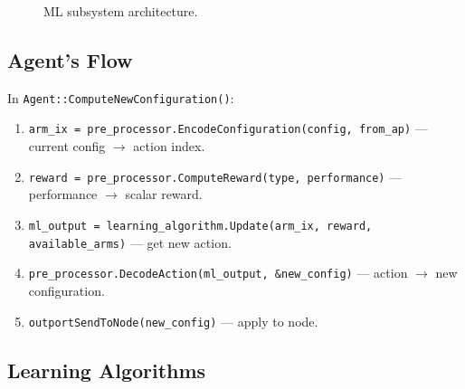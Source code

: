 \documentclass[11pt,a4paper]{article}
\begin{document}
\begin{figure}[h]
\centering
{}
\caption{ML subsystem architecture.}
\label{fig:ml}
\end{figure}

\subsection{Agent's Flow}

In \texttt{Agent::ComputeNewConfiguration()}:
\begin{enumerate}[nosep]
  \item \texttt{arm\_ix = pre\_processor.EncodeConfiguration(config, from\_ap)} --- current config $\to$ action index.
  \item \texttt{reward = pre\_processor.ComputeReward(type, performance)} --- performance $\to$ scalar reward.
  \item \texttt{ml\_output = learning\_algorithm.Update(arm\_ix, reward, available\_arms)} --- get new action.
  \item \texttt{pre\_processor.DecodeAction(ml\_output, \&new\_config)} --- action $\to$ new configuration.
  \item \texttt{outportSendToNode(new\_config)} --- apply to node.
\end{enumerate}

\subsection{Learning Algorithms}
\end{document}
